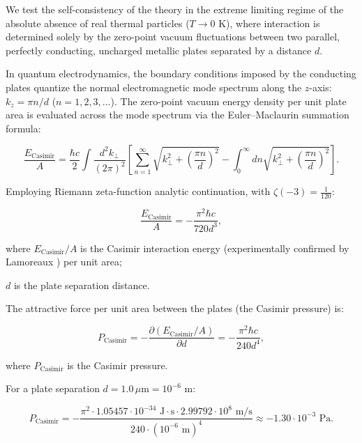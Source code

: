 \documentclass[11pt,a4paper]{article}
\theoremstyle{definition}
\begin{document}
We test the self-consistency of the theory in the extreme limiting regime of the absolute absence of real thermal particles ($T \to 0\text{ K}$), where interaction is determined solely by the zero-point vacuum fluctuations between two parallel, perfectly conducting, uncharged metallic plates separated by a distance $d$.

In quantum electrodynamics, the boundary conditions imposed by the conducting plates quantize the normal electromagnetic mode spectrum along the $z$-axis: $k_z = \pi n / d$ ($n = 1, 2, 3, \dots$). The zero-point vacuum energy density per unit plate area is evaluated across the mode spectrum via the Euler--Maclaurin summation formula:

\begin{equation}\label{eq:5.67}\tag{5.67}
\frac{E_{\text{Casimir}}}{A} = \frac{\hbar c}{2} \int \frac{d^2 k_\perp}{(2\pi)^2} \left[ \sum_{n=1}^\infty \sqrt{k_\perp^2 + \left(\frac{\pi n}{d}\right)^2} - \int_0^\infty dn \sqrt{k_\perp^2 + \left(\frac{\pi n}{d}\right)^2} \right].
\end{equation}

Employing Riemann zeta-function analytic continuation, with $\zeta(-3) = \frac{1}{120}$:

\begin{equation}\label{eq:5.68}\tag{5.68}
\frac{E_{\text{Casimir}}}{A} = - \frac{\pi^2 \hbar c}{720 d^3},
\end{equation}

where $E_{\text{Casimir}} / A$ is the Casimir interaction energy \cite{ref45} (experimentally confirmed by Lamoreaux \cite{ref46}) per unit area;  

$d$ is the plate separation distance.

The attractive force per unit area between the plates (the Casimir pressure) is:

\begin{equation}\label{eq:5.69}\tag{5.69}
P_{\text{Casimir}} = - \frac{\partial (E_{\text{Casimir}}/A)}{\partial d} = - \frac{\pi^2 \hbar c}{240 d^4},
\end{equation}

where $P_{\text{Casimir}}$ is the Casimir pressure.

For a plate separation $d = 1.0\,\mu\text{m} = 10^{-6}\text{ m}$:

\begin{equation}\label{eq:5.70}\tag{5.70}
P_{\text{Casimir}} = - \frac{\pi^2 \cdot 1.05457 \cdot 10^{-34}\text{ J}\cdot\text{s} \cdot 2.99792 \cdot 10^8\text{ m/s}}{240 \cdot (10^{-6}\text{ m})^4} \approx - 1.30 \cdot 10^{-3}\text{ Pa}.
\end{equation}
\end{document}
